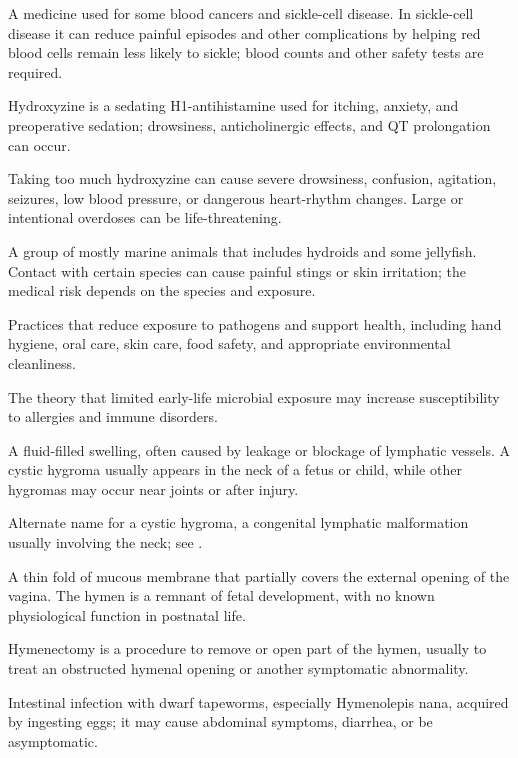  A medicine used for some blood cancers and sickle-cell disease. In sickle-cell disease it can reduce painful episodes and other complications by helping red blood cells remain less likely to sickle; blood counts and other safety tests are required.

 Hydroxyzine is a sedating H1-antihistamine used for itching, anxiety, and preoperative sedation; drowsiness, anticholinergic effects, and QT prolongation can occur.

 Taking too much hydroxyzine can cause severe drowsiness, confusion, agitation, seizures, low blood pressure, or dangerous heart-rhythm changes. Large or intentional overdoses can be life-threatening.

 A group of mostly marine animals that includes hydroids and some jellyfish. Contact with certain species can cause painful stings or skin irritation; the medical risk depends on the species and exposure.

 Practices that reduce exposure to pathogens and support health, including hand hygiene, oral care, skin care, food safety, and appropriate environmental cleanliness.

 The theory that limited early-life microbial exposure may increase susceptibility to allergies and immune disorders.

 A fluid-filled swelling, often caused by leakage or blockage of lymphatic vessels. A cystic hygroma usually appears in the neck of a fetus or child, while other hygromas may occur near joints or after injury.

 Alternate name for a cystic hygroma, a congenital lymphatic malformation usually involving the neck; see .

 A thin fold of mucous membrane that partially covers the external opening of the vagina.
The hymen is a remnant of fetal development, with no known physiological function in
postnatal life.

 Hymenectomy is a procedure to remove or open part of the hymen, usually to treat an obstructed hymenal opening or another symptomatic abnormality.

 Intestinal infection with dwarf tapeworms, especially Hymenolepis nana, acquired by ingesting eggs; it may cause abdominal symptoms, diarrhea, or be asymptomatic.

